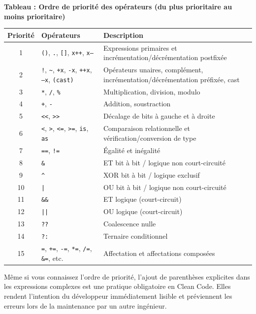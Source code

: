 \begin{center}
    \textbf{Tableau : Ordre de priorité des opérateurs (du plus prioritaire au moins prioritaire)} \\[0.3cm]
    \begin{tabular}{@{}clp{7cm}@{}}
        \toprule
        \textbf{Priorité} & \textbf{Opérateurs} & \textbf{Description} \\
        \midrule
        1 & \texttt{()}, \texttt{.}, \texttt{[]}, \texttt{x++}, \texttt{x--} & Expressions primaires et incrémentation/décrémentation postfixée \\
        2 & \texttt{!}, \texttt{\textasciitilde}, \texttt{+x}, \texttt{-x}, \texttt{++x}, \texttt{--x}, \texttt{(cast)} & Opérateurs unaires, complément, incrémentation/décrémentation préfixée, cast \\
        3 & \texttt{*}, \texttt{/}, \texttt{\%} & Multiplication, division, modulo \\
        4 & \texttt{+}, \texttt{-} & Addition, soustraction \\
        5 & \texttt{<<}, \texttt{>>} & Décalage de bits à gauche et à droite \\
        6 & \texttt{<}, \texttt{>}, \texttt{<=}, \texttt{>=}, \texttt{is}, \texttt{as} & Comparaison relationnelle et vérification/conversion de type \\
        7 & \texttt{==}, \texttt{!=} & Égalité et inégalité \\
        8 & \texttt{\&} & ET bit à bit / logique non court-circuité \\
        9 & \texttt{\textasciicircum} & XOR bit à bit / logique exclusif \\
        10 & \texttt{|} & OU bit à bit / logique non court-circuité \\
        11 & \texttt{\&\&} & ET logique (court-circuit) \\
        12 & \texttt{||} & OU logique (court-circuit) \\
        13 & \texttt{??} & Coalescence nulle \\
        14 & \texttt{?:} & Ternaire conditionnel \\
        15 & \texttt{=}, \texttt{+=}, \texttt{-=}, \texttt{*=}, \texttt{/=}, \texttt{\&=}, etc. & Affectation et affectations composées \\
        \bottomrule
    \end{tabular}
\end{center}

\begin{tcolorbox}[colback=backcolour,colframe=stringcolor,title=\textbf{Règle d'ingénierie : Utilisez les parenthèses}]
    Même si vous connaissez l'ordre de priorité, l'ajout de parenthèses explicites dans les expressions complexes est une pratique obligatoire en Clean Code. Elles rendent l'intention du développeur immédiatement lisible et préviennent les erreurs lors de la maintenance par un autre ingénieur.
\end{tcolorbox}

